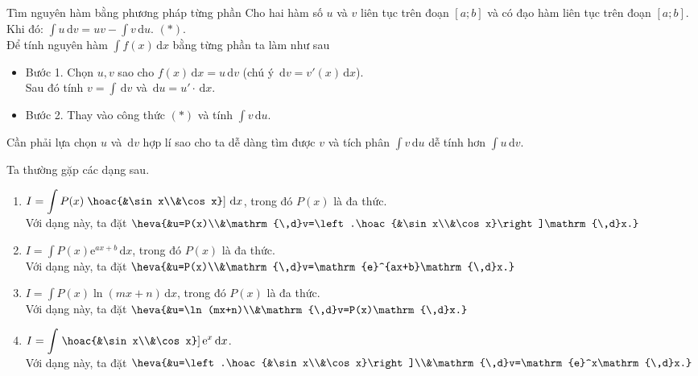 \begin{dang}{Tìm nguyên hàm bằng phương pháp từng phần}
	Cho hai hàm số $u$ và $v$ liên tục trên đoạn $[a;b]$ và có đạo hàm liên tục trên đoạn $[a;b]$.\\
	Khi đó: $\displaystyle\int u\mathrm{\,d}v=uv-\displaystyle\int v\mathrm{\,d}u$. $(*)$.\\
	Để tính nguyên hàm $\displaystyle\int f(x)\mathrm{\,d}x$ bằng từng phần ta làm như sau
	\begin{itemize}
	\item Bước 1. Chọn $u, v$ sao cho $f(x)\mathrm{\,d}x=u\mathrm{\,d}v$ (chú ý $\mathrm{\,d}v=v'(x)\mathrm{\,d}x$).\\
	Sau đó tính $v=\displaystyle\int\mathrm{\,d}v$ và $\mathrm{\,d}u=u'\cdot\mathrm{\,d}x$.
	\item Bước 2. Thay vào công thức $(*)$ và tính $\displaystyle\int v\mathrm{\,d}u$.
	\end{itemize}
\begin{note}
Cần phải lựa chọn $u$ và $\mathrm{\,d}v$ hợp lí sao cho ta dễ dàng tìm được $v$ và tích phân $\displaystyle\int v\mathrm{\,d}u$ dễ tính hơn $\displaystyle\int u\mathrm{\,d}v$.	
\end{note}
Ta thường gặp các dạng sau.
\begin{enumerate}[Dạng 1.]
	\item $I=\displaystyle\int P(x)\left.\hoac{&\sin x\\&\cos x}\right]\mathrm{\,d}x$, trong đó $P(x)$ là đa thức.\\
	Với dạng này, ta đặt $\heva{&u=P(x)\\&\mathrm{\,d}v=\left.\hoac{&\sin x\\&\cos x}\right]\mathrm{\,d}x.}$
	\item $I=\displaystyle\int P(x)\mathrm{e}^{ax+b}\mathrm{\,d}x$, trong đó $P(x)$ là đa thức.\\
	Với dạng này, ta đặt $\heva{&u=P(x)\\&\mathrm{\,d}v=\mathrm{e}^{ax+b}\mathrm{\,d}x.}$
	\item $I=\displaystyle\int P(x)\ln (mx+n)\mathrm{\,d}x$, trong đó $P(x)$ là đa thức.\\
	Với dạng này, ta đặt $\heva{&u=\ln (mx+n)\\&\mathrm{\,d}v=P(x)\mathrm{\,d}x.}$
	\item $I=\displaystyle\int\left.\hoac{&\sin x\\&\cos x}\right]\mathrm{e}^x\mathrm{\,d}x$.\\
	Với dạng này, ta đặt $\heva{&u=\left.\hoac{&\sin x\\&\cos x}\right]\\&\mathrm{\,d}v=\mathrm{e}^x\mathrm{\,d}x.}$
\end{enumerate}
\end{dang}
